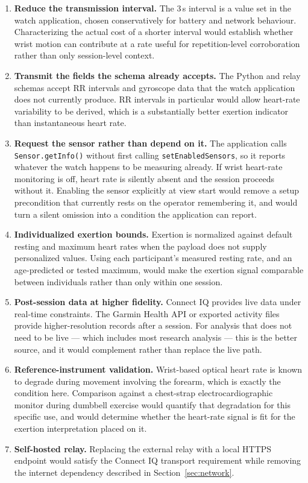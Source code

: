 \documentclass[11pt,a4paper]{article}
\newcommand{\code}[1]{\texttt{\small #1}}
\begin{document}
\begin{enumerate}
\item \textbf{Reduce the transmission interval.} The 3\,s interval is a value set
in the watch application, chosen conservatively for battery and network
behaviour. Characterizing the actual cost of a shorter interval would establish
whether wrist motion can contribute at a rate useful for repetition-level
corroboration rather than only session-level context.

\item \textbf{Transmit the fields the schema already accepts.} The Python and
relay schemas accept RR intervals and gyroscope data that the watch application
does not currently produce. RR intervals in particular would allow
heart-rate variability to be derived, which is a substantially better exertion
indicator than instantaneous heart rate.

\item \textbf{Request the sensor rather than depend on it.} The application
calls \code{Sensor.getInfo()} without first calling \code{setEnabledSensors},
so it reports whatever the watch happens to be measuring already. If wrist
heart-rate monitoring is off, heart rate is silently absent and the session
proceeds without it. Enabling the sensor explicitly at view start would remove
a setup precondition that currently rests on the operator remembering it, and
would turn a silent omission into a condition the application can report.

\item \textbf{Individualized exertion bounds.} Exertion is normalized against
default resting and maximum heart rates when the payload does not supply
personalized values. Using each participant's measured resting rate, and an
age-predicted or tested maximum, would make the exertion signal comparable
between individuals rather than only within one session.

\item \textbf{Post-session data at higher fidelity.} Connect IQ provides live
data under real-time constraints. The Garmin Health API or exported activity
files provide higher-resolution records after a session. For analysis that does
not need to be live --- which includes most research analysis --- this is the
better source, and it would complement rather than replace the live path.

\item \textbf{Reference-instrument validation.} Wrist-based optical heart rate is
known to degrade during movement involving the forearm, which is exactly the
condition here. Comparison against a chest-strap electrocardiographic monitor
during dumbbell exercise would quantify that degradation for this specific use,
and would determine whether the heart-rate signal is fit for the exertion
interpretation placed on it.

\item \textbf{Self-hosted relay.} Replacing the external relay with a local
HTTPS endpoint would satisfy the Connect IQ transport requirement while removing
the internet dependency described in Section~\ref{sec:network}.
\end{enumerate}
\end{document}
